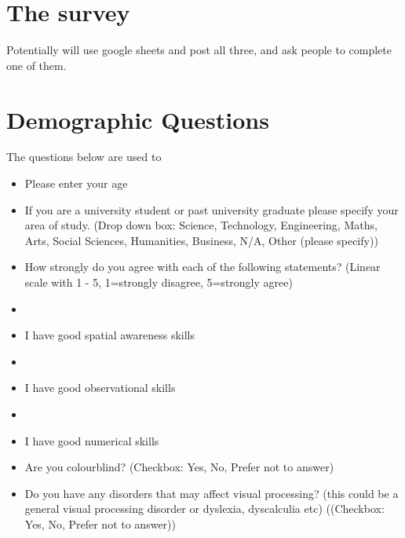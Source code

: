 
\section{The survey}

Potentially will use google sheets and post all three, and ask people to complete one of them.

\section{\textbf{Demographic Questions}}

The questions below are used to 

\begin{itemize}
    \item Please enter your age
    
    \item If you are a university student or past university graduate please specify your area of study. (Drop down box: Science, Technology, Engineering, Maths, Arts, Social Sciences, Humanities, Business, N/A, Other (please specify))

    \item How strongly do you agree with each of the following statements? (Linear scale with 1 - 5, 1=strongly disagree, 5=strongly agree)

    \item\item I have good spatial awareness skills 
    
    \item\item I have good observational skills 
    
    \item\item I have good numerical skills 
    
    \item Are you colourblind? (Checkbox: Yes, No, Prefer not to answer)
    
    \item Do you have any disorders that may affect visual processing? (this could be a general visual processing disorder 
    or dyslexia, dyscalculia etc)
    ((Checkbox: Yes, No, Prefer not to answer))
\end{itemize}


